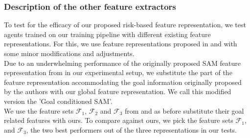 \subsubsection*{Description of the other feature extractors}
To test for the efficacy of our proposed risk-based feature representation, we test agents trained on our training pipeline with different existing feature representations. For this, we use feature representations proposed in \cite{fahad_learning_2018} and \cite{vasquez_inverse_2014} with some minor modifications and adjustments.\\
Due to an underwhelming performance of the originally proposed SAM feature representation from \cite{fahad_learning_2018} in our experimental setup, we substitute the part of the feature representation accommodating the goal information originally proposed by the authors with our global feature representation. We call this modified version the 'Goal conditioned SAM'.\\
We use the feature sets $\mathcal{F}_1$, $\mathcal{F}_2$ and $\mathcal{F}_3$ from \cite{vasquez_inverse_2014} and as before substitute their goal related features with ours.
To compare against ours, we pick the feature sets $\mathcal{F}_1$, and $\mathcal{F}_3$, the two best performers out of the three representations in our tests.\\
